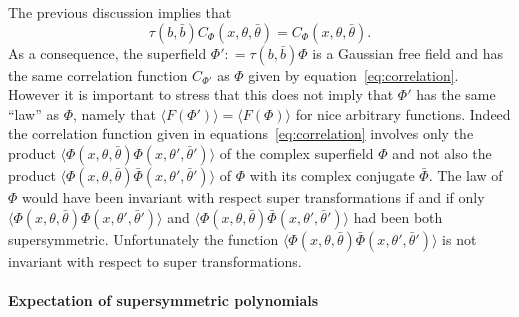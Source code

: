 \documentclass[a4paper,10pt]{article}
\begin{document}
\begin{remark}
  \label{remark_supersymmetry}The previous discussion implies that
  \begin{equation}
    \tau (b, \bar{b}) C_{\Phi} (x, \theta, \bar{\theta}) = C_{\Phi} (x,
    \theta, \bar{\theta}) . \label{eq:invariance}
  \end{equation}
  As a consequence, the superfield $\Phi' : = \tau (b, \bar{b}) \Phi$ is a
  Gaussian free field and has the same correlation function $C_{\Phi'}$ as
  $\Phi$ given by equation~{\eqref{eq:correlation}}. However it is important
  to stress that this does not imply that $\Phi'$ has the same ``law'' as
  $\Phi$, namely that $\langle F (\Phi') \rangle = \langle F (\Phi) \rangle$
  for nice arbitrary functions. Indeed the correlation function given in
  equations~{\eqref{eq:correlation}} involves only the product $\langle \Phi
  (x, \theta, \bar{\theta}) \Phi (x, \theta', \bar{\theta}') \rangle$ of the
  complex superfield $\Phi$ and not also the product $\langle \Phi (x, \theta,
  \bar{\theta}) \bar{\Phi} (x, \theta', \bar{\theta}') \rangle$ of $\Phi$ with
  its complex conjugate $\bar{\Phi}$. The law of $\Phi$ would have been
  invariant with respect super transformations if and if only $\langle \Phi
  (x, \theta, \bar{\theta}) \Phi (x, \theta', \bar{\theta}') \rangle$ and
  $\langle \Phi (x, \theta, \bar{\theta}) \bar{\Phi} (x, \theta',
  \bar{\theta}') \rangle$ had been both supersymmetric. Unfortunately the
  function $\langle \Phi (x, \theta, \bar{\theta}) \bar{\Phi} (x, \theta',
  \bar{\theta}') \rangle$ is not invariant with respect to super
  transformations.
\end{remark}

\paragraph{Expectation of supersymmetric polynomials}
\end{document}
